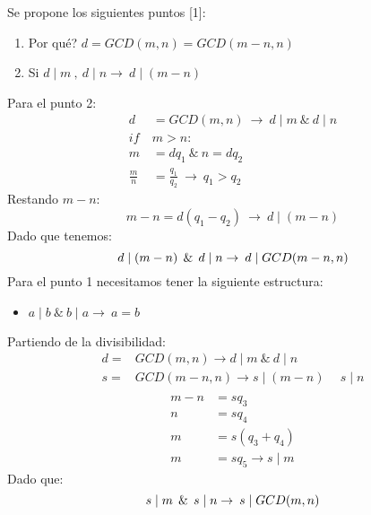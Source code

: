 Se propone los siguientes puntos [1]:
\begin{enumerate}
 \item \textquestiondown Por qu\'e? $d=GCD(m,n)=GCD(m-n,n)$
 \item Si $ d\mid m\: ,\: d\mid n \rightarrow \: d\mid (m-n)$ 
\end{enumerate}
Para el punto 2:
\begin{equation*}
 \begin{align}
  d&=GCD(m,n)\: \rightarrow \: d\mid m \:\&\:d\mid n\\
  if\:&m>n:\\
  m&=dq_1 \: \& \: n=dq_2 \\
  \frac{m}{n} &=\frac{q_1}{q_2} \: \rightarrow \: q_1>q_2
 \end{align}
\end{equation*}
Restando $m-n$:
\begin{equation}
 m-n=d(q_1-q_2)\: \rightarrow \: d\mid (m-n)
\end{equation}
Dado que tenemos:
\begin{equation}
 d \mid (m-n) \:\:\&\:\: d\mid n \rightarrow \:d\mid GCD(m-n,n) \\
\end{equation}
Para el punto 1 necesitamos tener la siguiente estructura:
\begin{itemize}
 \item $a\mid b \:\&\:b\mid a\rightarrow\:a=b$
\end{itemize}
Partiendo de la divisibilidad:
\begin{equation*}
 \begin{align}
  d=&GCD(m,n) \rightarrow d\mid m \:\&\: d\mid n \\
  s=&GCD(m-n,n) \rightarrow s\mid(m-n) \:&\: s\mid n \\
 \end{align}
\end{equation*}
\begin{equation*}
 \begin{align}
  m-n&=sq_3\\
  n&=sq_4\\
  m&=s(q_3+q_4)\\
  m&=sq_5 \rightarrow s\mid m
 \end{align}
\end{equation*}
Dado que:
\begin{equation}
  s \mid m \:\:\&\:\: s\mid n \rightarrow \:s\mid GCD(m,n) \\
\end{equation}
